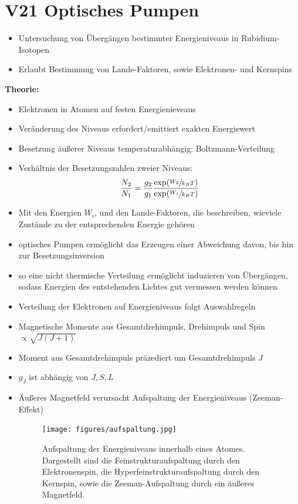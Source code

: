 \section{V21 Optisches Pumpen}
\label{sec:V21}

\begin{itemize}
    \item Untersuchung von Übergängen bestimmter Energieniveaus in Rubidium-Isotopen
    \item Erlaubt Bestimmung von Lande-Faktoren, sowie Elektronen- und Kernspins
\end{itemize}

\textbf{Theorie:}
\begin{itemize}
    \item Elektronen in Atomen auf festen Energienieveaus
    \item Veränderung des Niveaus erfordert/emittiert exakten Energiewert
    \item Besetzung äußerer Niveaus temperaturabhängig: Boltzmann-Verteilung
    \item Verhältnis der Besetzungszahlen zweier Niveaus:
        \begin{equation}
            \frac{N_2}{N_1}=\frac{g_2}{g_1}\frac{\exp(\sfrac{W_2}{k_BT})}{\exp(\sfrac{W_1}{k_BT})}
        \end{equation}
    \item Mit den Energien $W_i$, und den Lande-Faktoren, die beschreiben, wieviele Zustände zu der entsprechenden Energie gehören
    \item optisches Pumpen ermöglicht das Erzeugen einer Abweichung davon, bis hin zur Besetzungsinversion
    \item so eine nicht thermische Verteilung ermöglicht induzieren von Übergängen, sodass Energien des entstehenden Lichtes gut vermessen werden können
    \item Verteilung der Elektronen auf Energieniveaus folgt Auswahlregeln
    \item Magnetische Momente aus Gesamtdrehimpuls, Drehimpuls und Spin $\propto \sqrt{J(J+1)}$
    \item Moment aus Gesamtdrehimpuls präzediert um Gesamtdrehimpuls $J$
    \item $g_J$ ist abhängig von $J,S,L$
    \item Äußeres Magnetfeld verursacht Aufspaltung der Energieniveaus (Zeeman-Effekt)
       \begin{figure}[htb]
          \centering
          \texttt{[image: figures/aufspaltung.jpg]}
          \caption{Aufspaltung der Energieniveaus innerhalb eines Atomes. Dargestellt
                    sind die Feinstrukturaufspaltung durch den Elektronenspin, die
                    Hyperfeinstrukturaufspaltung durch den Kernspin, sowie die Zeeman-Aufspaltung
                    durch ein äußeres Magnetfeld.}
        \end{figure}
\end{itemize}

